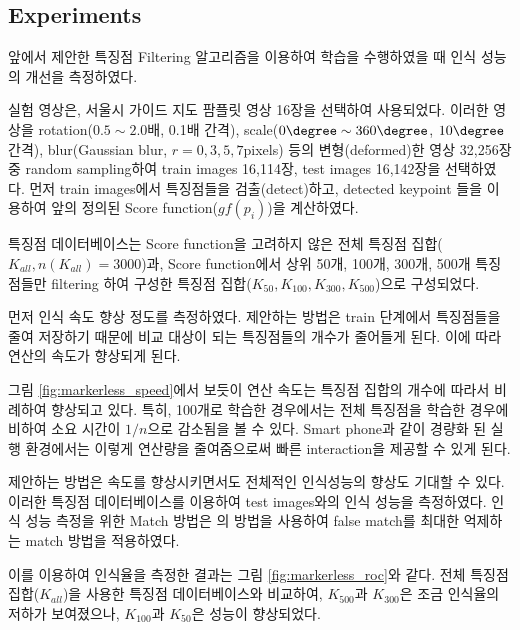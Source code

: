 

\subsection{Experiments}

앞에서 제안한 특징점 Filtering 알고리즘을 이용하여 학습을 수행하였을 때 인식 성능의 개선을 측정하였다. 

실험 영상은, 서울시 가이드 지도 팜플릿 영상 16장을 선택하여 사용되었다. 이러한 영상을 rotation($0.5\sim2.0$배, 0.1배 간격), scale($0\degree\sim360\degree$, $10\degree$ 간격), blur(Gaussian blur, $r=0,3,5,7$pixels) 등의 변형(deformed)한 영상 32,256장 중 random sampling하여 train images 16,114장, test images 16,142장을 선택하였다.
먼저 train images에서 특징점들을 검출(detect)하고, detected keypoint 들을 이용하여 앞의 정의된 Score function($gf(p_i)$)을 계산하였다. 

특징점 데이터베이스는 Score function을 고려하지 않은 전체 특징점 집합($K_{all}, n(K_{all}) = 3000$)과, Score function에서 상위 50개, 100개, 300개, 500개 특징점들만 filtering 하여 구성한 특징점 집합($K_{50}, K_{100}, K_{300}, K_{500}$)으로 구성되었다. 

먼저 인식 속도 향상 정도를 측정하였다. 제안하는 방법은 train 단계에서 특징점들을 줄여 저장하기 때문에 비교 대상이 되는 특징점들의 개수가 줄어들게 된다. 이에 따라 연산의 속도가 향상되게 된다.

\label{fig:markerless_speed}
그림 \ref{fig:markerless_speed}에서 보듯이 연산 속도는 특징점 집합의 개수에 따라서 비례하여 향상되고 있다. 특히, 100개로 학습한 경우에서는 전체 특징점을 학습한 경우에 비하여 소요 시간이 $1/n$으로 감소됨을 볼 수 있다. Smart phone과 같이 경량화 된 실행 환경에서는 이렇게 연산량을 줄여줌으로써 빠른 interaction을 제공할 수 있게 된다.

제안하는 방법은 속도를 향상시키면서도 전체적인 인식성능의 향상도 기대할 수 있다. 이러한 특징점 데이터베이스를 이용하여 test images와의 인식 성능을 측정하였다. 인식 성능 측정을 위한 Match 방법은 \cite{choi_smart_2014}의 방법을 사용하여 false match를 최대한 억제하는 match 방법을 적용하였다.

이를 이용하여 인식율을 측정한 결과는 그림 \ref{fig:markerless_roc}와 같다. 전체 특징점 집합($K_{all}$)을 사용한 특징점 데이터베이스와 비교하여, $K_{500}$과 $K_{300}$은 조금 인식율의 저하가 보여졌으나, $K_{100}$과 $K_{50}$은 성능이 향상되었다. 

